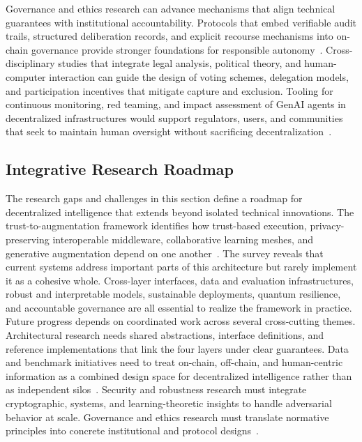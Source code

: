 \documentclass[5p,twocolumn]{elsarticle}
\begin{document}
Governance and ethics research can advance mechanisms that align technical guarantees with institutional accountability. Protocols that embed verifiable audit trails, structured deliberation records, and explicit recourse mechanisms into on-chain governance provide stronger foundations for responsible autonomy~\cite{wang2024sok}. Cross-disciplinary studies that integrate legal analysis, political theory, and human-computer interaction can guide the design of voting schemes, delegation models, and participation incentives that mitigate capture and exclusion. Tooling for continuous monitoring, red teaming, and impact assessment of GenAI agents in decentralized infrastructures would support regulators, users, and communities that seek to maintain human oversight without sacrificing decentralization~\cite{naraganahalli2025decentralized}.

\subsection{Integrative Research Roadmap}
The research gaps and challenges in this section define a roadmap for decentralized intelligence that extends beyond isolated technical innovations. The trust-to-augmentation framework identifies how trust-based execution, privacy-preserving interoperable middleware, collaborative learning meshes, and generative augmentation depend on one another~\cite{xu2024survey,huang2023overview,luo2024survey,huang2024large}. The survey reveals that current systems address important parts of this architecture but rarely implement it as a cohesive whole. Cross-layer interfaces, data and evaluation infrastructures, robust and interpretable models, sustainable deployments, quantum resilience, and accountable governance are all essential to realize the framework in practice. Future progress depends on coordinated work across several cross-cutting themes. Architectural research needs shared abstractions, interface definitions, and reference implementations that link the four layers under clear guarantees. Data and benchmark initiatives need to treat on-chain, off-chain, and human-centric information as a combined design space for decentralized intelligence rather than as independent silos~\cite{jain2024wire}. Security and robustness research must integrate cryptographic, systems, and learning-theoretic insights to handle adversarial behavior at scale. Governance and ethics research must translate normative principles into concrete institutional and protocol designs~\cite{naraganahalli2025decentralized}.
\end{document}
